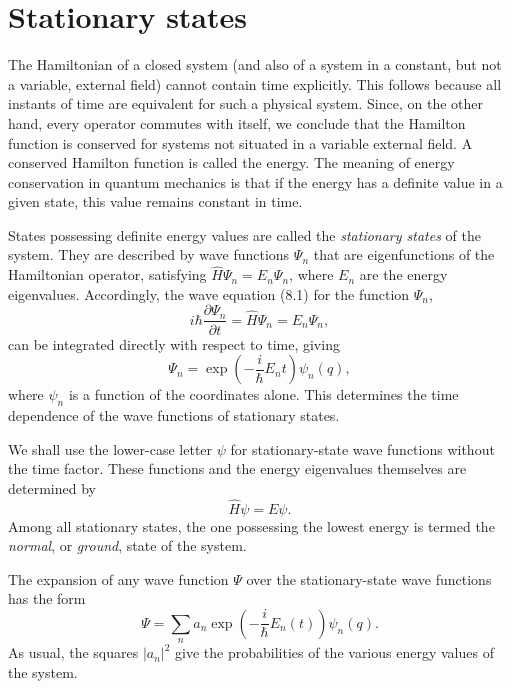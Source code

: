\section{Stationary states}

The Hamiltonian of a closed system (and also of a system in a constant, but not
a variable, external field) cannot contain time explicitly. This follows
because all instants of time are equivalent for such a physical system. Since,
on the other hand, every operator commutes with itself, we conclude that the
Hamilton function is conserved for systems not situated in a variable external
field. A conserved Hamilton function is called the energy. The meaning of
energy conservation in quantum mechanics is that if the energy has a definite
value in a given state, this value remains constant in time.

States possessing definite energy values are called the \textit{stationary
states} of the system. They are described by wave functions $\Psi_n$ that are
eigenfunctions of the Hamiltonian operator, satisfying
$\hat H\Psi_n=E_n\Psi_n$, where $E_n$ are the energy eigenvalues. Accordingly,
the wave equation (8.1) for
the function $\Psi_n$,
\[
  i\hbar\frac{\partial\Psi_n}{\partial t}=\hat H\Psi_n=E_n\Psi_n,
\]
can be integrated directly with respect to time, giving
\begin{equation}
  \Psi_n=\exp\left(-\frac{i}{\hbar}E_nt\right)\psi_n(q),
  \tag{10.1}
\end{equation}
where $\psi_n$ is a function of the coordinates alone. This determines the
time dependence of the wave functions of stationary states.

We shall use the lower-case letter $\psi$ for stationary-state wave functions
without the time factor. These functions and the energy eigenvalues themselves
are determined by
\begin{equation}
  \hat H\psi=E\psi.
  \tag{10.2}
\end{equation}
Among all stationary states, the one possessing the lowest energy is termed
the \textit{normal}, or \textit{ground}, state of the system.

The expansion of any wave function $\Psi$ over the stationary-state wave
functions has the form
\begin{equation}
  \Psi=\sum_n a_n\exp\left(-\frac{i}{\hbar}E_n(t)\right)\psi_n(q).
  \tag{10.3}
\end{equation}
As usual, the squares $|a_n|^2$ give the probabilities of the various energy
values of the system.

